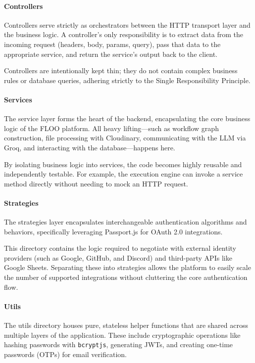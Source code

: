 \paragraph{Controllers}
Controllers serve strictly as orchestrators between the HTTP transport layer and the business logic. A controller's only responsibility is to extract data from the incoming request (headers, body, params, query), pass that data to the appropriate service, and return the service's output back to the client.

Controllers are intentionally kept thin; they do not contain complex business rules or database queries, adhering strictly to the Single Responsibility Principle.

\paragraph{Services}
The service layer forms the heart of the backend, encapsulating the core business logic of the FLOO platform. All heavy lifting—such as workflow graph construction, file processing with Cloudinary, communicating with the LLM via Groq, and interacting with the database—happens here.

By isolating business logic into services, the code becomes highly reusable and independently testable. For example, the execution engine can invoke a service method directly without needing to mock an HTTP request.

\paragraph{Strategies}
The strategies layer encapsulates interchangeable authentication algorithms and behaviors, specifically leveraging Passport.js for OAuth 2.0 integrations. 

This directory contains the logic required to negotiate with external identity providers (such as Google, GitHub, and Discord) and third-party APIs like Google Sheets. Separating these into strategies allows the platform to easily scale the number of supported integrations without cluttering the core authentication flow.

\paragraph{Utils}
The utils directory houses pure, stateless helper functions that are shared across multiple layers of the application. These include cryptographic operations like hashing passwords with \texttt{bcryptjs}, generating JWTs, and creating one-time passwords (OTPs) for email verification. 


